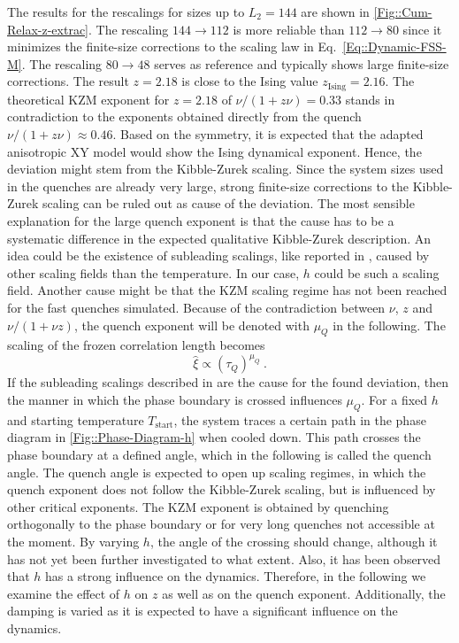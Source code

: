 	The results for the rescalings for sizes up to $L_2 =	144$ are shown in \autoref{Fig::Cum-Relax-z-extrac}. The rescaling $144 \rightarrow 112$ is more reliable than $112 \rightarrow 80$ since it minimizes the finite-size corrections to the scaling law in  Eq.~\eqref{Eq::Dynamic-FSS-M}. The rescaling $80 \rightarrow 48$ serves as reference and typically shows large finite-size corrections. The result $z =	2.18$ is close to the Ising value $z_{\text{Ising}} = 2.16$. The theoretical KZM exponent for $z=2.18$ of $\nu /	(1 + z\nu) = 0.33	$ stands in contradiction to the exponents obtained directly from the quench $\nu /	(1 + z\nu) \approx 0.46$. Based on the symmetry, it is expected that the adapted anisotropic XY model would show the Ising dynamical exponent. Hence, the deviation might stem from the Kibble-Zurek scaling. Since the system sizes used in the quenches are already very large, strong finite-size corrections to the Kibble-Zurek scaling can be ruled out as cause of the deviation. The most sensible explanation for the large quench exponent is that the cause has to be a systematic difference in the expected qualitative Kibble-Zurek description. An idea could be the existence of subleading scalings, like reported in \cite{ladewig2020kibble}, caused by other scaling fields than the temperature. In our case, $h$ could be such a scaling field. Another cause might be that the KZM scaling regime has not been reached for the fast quenches simulated. Because of the contradiction between $\nu$, $z$ and $\nu /	(1 + \nu z)$, the quench exponent will be denoted with $\mu_{Q}$ in the following. The scaling of the frozen correlation length becomes 
	\begin{equation}
		\hat{\xi} \propto \left(\tau_Q \right)^{\mu_{{Q}}}~.
	\end{equation}	
	If the subleading scalings described in \cite{ladewig2020kibble} are the cause for the found deviation, then the manner in which the phase boundary is crossed influences $\mu_Q$. For a fixed $h$ and starting temperature $T_{\text{start}}$, the system traces a certain path in the phase diagram in \autoref{Fig::Phase-Diagram-h} when cooled down. This path crosses the phase boundary at a defined angle, which in the following is called the quench angle. The quench angle is expected to open up scaling regimes, in which the quench exponent does not follow the Kibble-Zurek scaling, but is influenced by other critical exponents. The KZM exponent is obtained by quenching orthogonally to the phase boundary or for very long quenches not accessible at the moment. By varying $h$, the angle of the crossing should change, although it has not yet been further investigated to what extent. Also, it has been observed that $h$ has a strong influence on the dynamics. Therefore, in the following we examine the effect of $h$ on $z$ as well as on the quench exponent. Additionally, the damping is varied as it is expected to have a significant influence on the dynamics.
